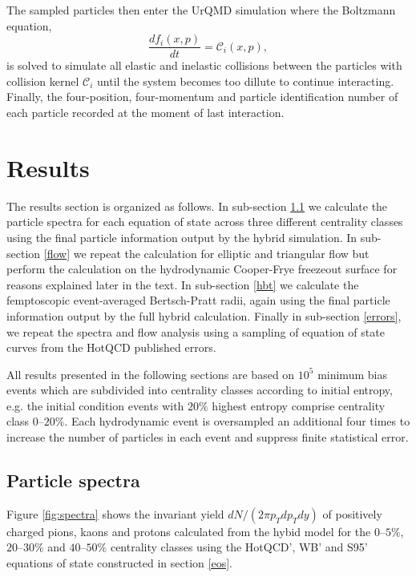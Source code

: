 \documentclass[aps,prc,reprint,amsmath,nofootinbib,superscriptaddress]{revtex4-1}
\begin{document}
The sampled particles then enter the UrQMD simulation where the Boltzmann equation, 
\begin{equation}
 \frac{df_i(x,p)}{dt} = \mathcal{C}_i(x,p),
\end{equation}
is solved to simulate all elastic and inelastic collisions between the particles with collision kernel $\mathcal{C}_i$ until the system becomes too dillute to continue interacting. 
Finally, the four-position, four-momentum and particle identification number of each particle recorded at the moment of last interaction. 
 
\section{Results}

The results section is organized as follows. In sub-section \ref{spectra} we calculate the particle spectra for each equation of state across three different centrality classes using the final 
particle information output by the hybrid simulation. In sub-section \ref{flow} we repeat the calculation for elliptic and triangular flow but perform the calculation on the 
hydrodynamic Cooper-Frye freezeout surface for reasons explained later in the text. In sub-section \ref{hbt} we calculate the femptoscopic event-averaged Bertsch-Pratt radii, again using the 
final particle information output by the full hybrid calculation. Finally in sub-section \ref{errors}, we repeat the spectra and flow analysis using a sampling of equation of state curves from the 
HotQCD published errors. 

All results presented in the following sections are based on $10^5$ minimum bias events which are subdivided into centrality classes according to initial entropy, e.g. the initial condition events 
with $20\%$ highest entropy comprise centrality class $0$--$20\%$. Each hydrodynamic event is oversampled an additional four times to increase the number of particles in each event and suppress 
finite statistical error.

\subsection{Particle spectra}
\label{spectra}

Figure \ref{fig:spectra} shows the invariant yield $dN/(2\pi p_T dp_T dy)$ of positively charged pions, kaons and protons calculated from the hybid model for the $0$--$5\%$, $20$--$30\%$
and $40$--$50\%$ centrality classes using the HotQCD', WB' and S95' equations of state constructed in section \ref{eos}. 
\end{document}

